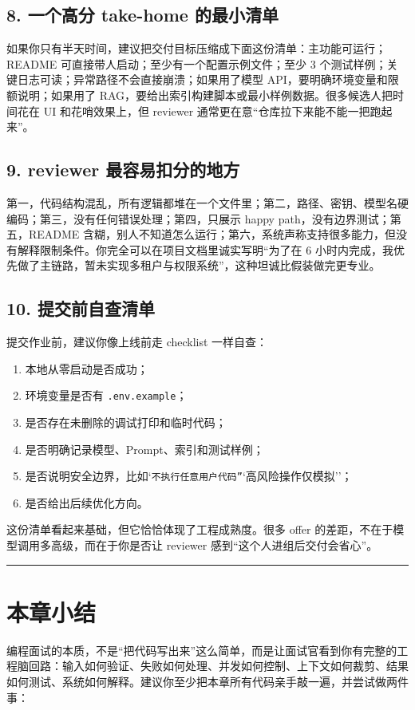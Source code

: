 \subsection{8. 一个高分 take-home 的最小清单}
如果你只有半天时间，建议把交付目标压缩成下面这份清单：主功能可运行；README 可直接带人启动；至少有一个配置示例文件；至少 3 个测试样例；关键日志可读；异常路径不会直接崩溃；如果用了模型 API，要明确环境变量和限额说明；如果用了 RAG，要给出索引构建脚本或最小样例数据。很多候选人把时间花在 UI 和花哨效果上，但 reviewer 通常更在意``仓库拉下来能不能一把跑起来''。


\subsection{9. reviewer 最容易扣分的地方}
第一，代码结构混乱，所有逻辑都堆在一个文件里；第二，路径、密钥、模型名硬编码；第三，没有任何错误处理；第四，只展示 happy path，没有边界测试；第五，README 含糊，别人不知道怎么运行；第六，系统声称支持很多能力，但没有解释限制条件。你完全可以在项目文档里诚实写明``为了在 6 小时内完成，我优先做了主链路，暂未实现多租户与权限系统''，这种坦诚比假装做完更专业。


\subsection{10. 提交前自查清单}
提交作业前，建议你像上线前走 checklist 一样自查：

\begin{enumerate}[leftmargin=2em]
\item 本地从零启动是否成功；
\item 环境变量是否有 \texttt{.env.example}；
\item 是否存在未删除的调试打印和临时代码；
\item 是否明确记录模型、Prompt、索引和测试样例；
\item 是否说明安全边界，比如`\texttt{不执行任意用户代码''}`高风险操作仅模拟''；
\item 是否给出后续优化方向。
\end{enumerate}
这份清单看起来基础，但它恰恰体现了工程成熟度。很多 offer 的差距，不在于模型调用多高级，而在于你是否让 reviewer 感到``这个人进组后交付会省心''。


\bigskip\hrule\bigskip

\section{本章小结}

编程面试的本质，不是``把代码写出来''这么简单，而是让面试官看到你有完整的工程脑回路：输入如何验证、失败如何处理、并发如何控制、上下文如何裁剪、结果如何测试、系统如何解释。建议你至少把本章所有代码亲手敲一遍，并尝试做两件事：


